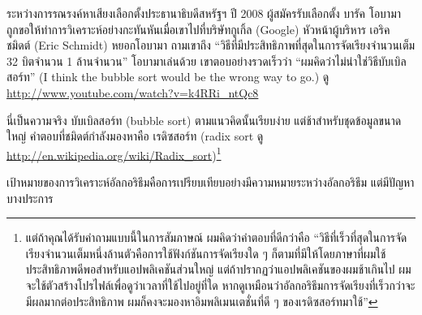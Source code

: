 ระหว่างการรณรงค์หาเสียงเลือกตั้งประธานาธิบดีสหรัฐฯ ปี 2008 ผู้สมัครรับเลือกตั้ง บารัค โอบามา ถูกขอให้ทำการวิเคราะห์อย่างกะทันหันเมื่อเขาไปที่บริษัทกูเกิ้ล (Google) 
หัวหน้าผู้บริหาร เอริค ชมิดต์ (Eric Schmidt) หยอกโอบามา ถามเขาถึง ``วิธีที่มีประสิทธิภาพที่สุดในการจัดเรียงจำนวนเต็ม 32 บิตจำนวน 1 ล้านจำนวน'' 
โอบามาเล่นด้วย เขาตอบอย่างรวดเร็วว่า ``ผมคิดว่าไม่น่าใช่วิธีบับเบิลสอร์ท'' (I think the bubble sort would be the wrong way to go.) ดู \url{http://www.youtube.com/watch?v=k4RRi_ntQc8}


นี่เป็นความจริง บับเบิลสอร์ท (bubble sort) ตามแนวคิดนั้นเรียบง่าย แต่ช้าสำหรับชุดข้อมูลขนาดใหญ่ 
คำตอบที่ชมิดต์กำลังมองหาคือ เรดิซสอร์ท (radix sort ดู \url{http://en.wikipedia.org/wiki/Radix_sort})\footnote{
แต่ถ้าคุณได้รับคำถามแบบนี้ในการสัมภาษณ์ ผมคิดว่าคำตอบที่ดีกว่าคือ 
``วิธีที่เร็วที่สุดในการจัดเรียงจำนวนเต็มหนึ่งล้านตัวคือการใช้ฟังก์ชันการจัดเรียงใด ๆ ก็ตามที่มีให้โดยภาษาที่ผมใช้ 
ประสิทธิภาพดีพอสำหรับแอปพลิเคชันส่วนใหญ่ แต่ถ้าปรากฏว่าแอปพลิเคชันของผมช้าเกินไป 
ผมจะใช้ตัวสร้างโปรไฟล์เพื่อดูว่าเวลาที่ใช้ไปอยู่ที่ใด หากดูเหมือนว่าอัลกอริธึมการจัดเรียงที่เร็วกว่าจะมีผลมากต่อประสิทธิภาพ 
ผมก็คงจะมองหาอิมพลิเมนเตชั่นที่ดี ๆ ของเรดิซสอร์ทมาใช้''}


เป้าหมายของการวิเคราะห์อัลกอริธึมคือการเปรียบเทียบอย่างมีความหมายระหว่างอัลกอริธึม แต่มีปัญหาบางประการ

